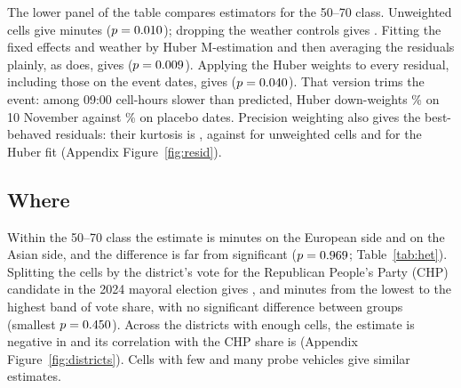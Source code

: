 \documentclass[11pt,a4paper]{article}
\newcommand{\Tab}[1]{\begin{center}\footnotesize\setlength{\tabcolsep}{4.5pt}\end{center}}
\begin{document}
The lower panel of the table compares estimators for the 50--70 class. Unweighted cells give
\regUnwFast{} minutes ($p = 0.010$); dropping the weather controls gives \regNoCtlFast{}.
Fitting the fixed effects and weather by Huber M-estimation and then averaging the residuals plainly,
as \citet{rosenbaum2002} does, gives \regRbFast{} ($p = 0.009$). Applying the Huber weights to
every residual, including those on the event dates, gives \regHbFast{} ($p = 0.040$). That
version trims the event: among 09:00 cell-hours slower than predicted, Huber down-weights
\hbEventNeg\% on 10 November against \hbPlaceboNeg\% on placebo dates. Precision weighting also gives
the best-behaved residuals: their kurtosis is \kurtPrec{}, against \kurtPlain{} for unweighted cells
and \kurtHuber{} for the Huber fit (Appendix Figure~\ref{fig:resid}).

\begin{table}[t]\centering
\caption{Fixed-effects regression version. Cell-by-date and cell-by-day-type-by-hour fixed effects,
school-break hour effects, and hourly rain and temperature are partialled out over all days within
eight weeks of 10 November; the event statistic is formed from the residuals of same-weekday pool
dates. In the main version each cell is weighted by the inverse of its residual variance on days
outside the pool. Minutes are full-stop-equivalent minutes; $p$-values are one-sided placebo-date $p$-values.}
\label{tab:reg}
\Tab{regression}
\end{table}

\subsection{Where}\label{sec:het}

Within the 50--70 class the estimate is \minEurope{} minutes on the European side and \minAsia{} on
the Asian side, and the difference is far from significant ($p = 0.969$;
Table~\ref{tab:het}). Splitting the cells by the district's vote for the Republican People's Party
(CHP) candidate in the 2024 mayoral election gives \minChpLow, \minChpMid{} and \minChpHigh{}
minutes from the lowest to the highest band of vote share, with no significant difference between groups (smallest
$p = 0.450$). Across the \nDistricts{} districts with enough cells, the estimate is
negative in \nDistNeg{} and its correlation with the CHP share is \corrChp{}
(Appendix Figure~\ref{fig:districts}). Cells with few and
many probe vehicles give similar estimates.
\end{document}

